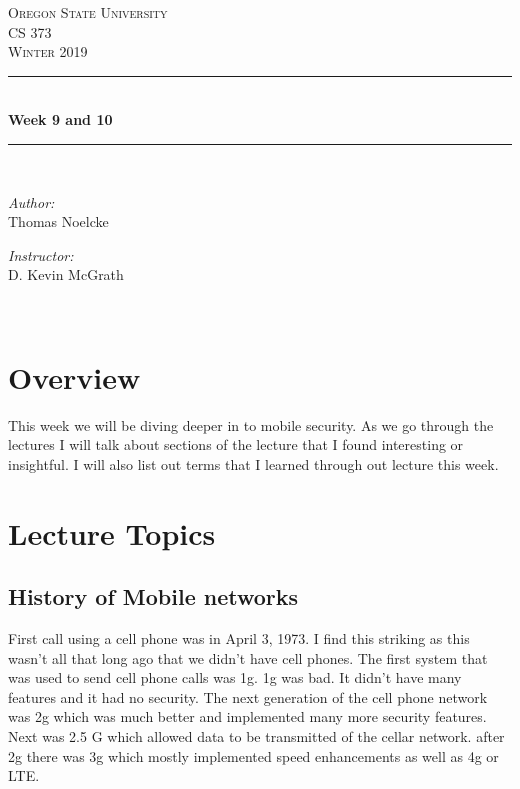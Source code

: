 \documentclass[letterpaper, onecolumn,10pt]{IEEEtran}
\begin{document}
    \begin{titlepage}
    \newcommand{\HRule}{\rule{\linewidth}{0.5mm}}
    \center
    \textsc{\Large Oregon State University}\\[1.5cm]
    \textsc{\Large CS 373}\\[0.5cm]
    \textsc{\Large Winter 2019}\\[0.5cm]
    \HRule \\[0.4cm]
    { \huge \bfseries Week 9 and 10}\\[0.4cm] %
    \HRule \\[1.5cm]
    \begin{minipage}{0.4\textwidth}
        \begin{flushleft} \large
        \emph{Author:}\\
        Thomas Noelcke
        \end{flushleft}
    \end{minipage}
    \begin{minipage}{0.4\textwidth}
        \begin{flushright} \large
        \emph{Instructor:} \\
        D. Kevin McGrath\\
        \end{flushright}
    \end{minipage}\\[2cm]
		\end{titlepage}
		
		
		\section{Overview}
		This week we will be diving deeper in to mobile security. As we go through the lectures I will talk about sections of the lecture that I found interesting or insightful. I will also list out terms that I learned through out lecture this week.\\
		
		\section{Lecture Topics}
		    \subsection{History of Mobile networks}
		    First call using a cell phone was in April 3, 1973. I find this striking as this wasn't all that long ago that we didn't have cell phones. The first system that was used to send cell phone calls was 1g. 1g was bad. It didn't have many features and it had no security. The next generation of the cell phone network was 2g which was much better and implemented many more security features. Next was 2.5 G which allowed data to be transmitted of the cellar network. after 2g there was 3g which mostly implemented speed enhancements as well as 4g or LTE.\\
		    
\end{document}
